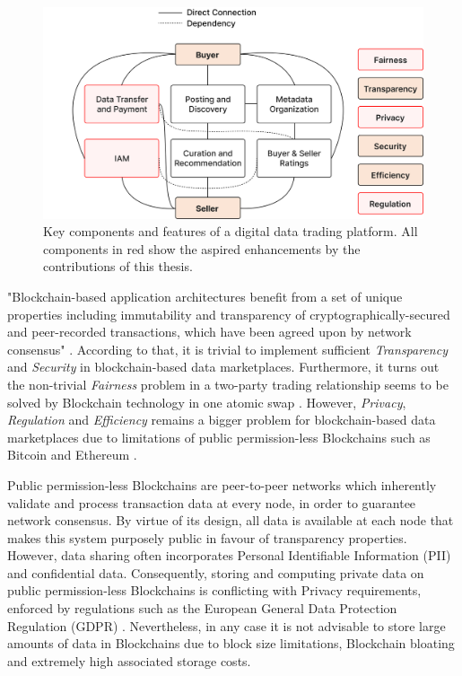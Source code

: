 \begin{figure}[!htb]
    \centering
    \includegraphics[width=13cm]{images/components.png}
    \caption[Key components and features of a digital data trading platform]{Key components and features of a digital data trading platform. All components in red show the aspired enhancements by the contributions of this thesis.}
    \label{fig:components}
\end{figure}

"Blockchain-based application architectures benefit from a set of unique properties including immutability and transparency of cryptographically-secured and peer-recorded transactions, which have been agreed upon by network consensus" \cite{eberhardtBlockchainInsightsOffChaining2017}. According to that, it is trivial to implement sufficient \emph{Transparency} and \emph{Security} in blockchain-based data marketplaces. Furthermore, it turns out the non-trivial \emph{Fairness} problem in a two-party trading relationship seems to be solved by Blockchain technology in one atomic swap \cite{dziembowskiFairSwapHowFairly2018,liZKCPlusOptimizedFairexchange2021}. However, \emph{Privacy}, \emph{Regulation} and \emph{Efficiency} remains a bigger problem for blockchain-based data marketplaces due to limitations of public permission-less Blockchains such as Bitcoin \cite{nakamotoBitcoinPeertoPeerElectronic} and Ethereum \cite{buterinNEXTGENERATIONSMART}.

Public permission-less Blockchains are peer-to-peer networks which inherently validate and process transaction data at every node, in order to guarantee network consensus. By virtue of its design, all data is available at each node that makes this system purposely public in favour of transparency properties. However, data sharing often incorporates Personal Identifiable Information (PII) and confidential data. Consequently, storing and computing private data on public permission-less Blockchains is conflicting with Privacy requirements, enforced by regulations such as the European General Data Protection Regulation (GDPR) \cite{european_commission_regulation_2016}. Nevertheless, in any case it is not advisable to store large amounts of data in Blockchains due to block size limitations, Blockchain bloating and extremely high associated storage costs.

